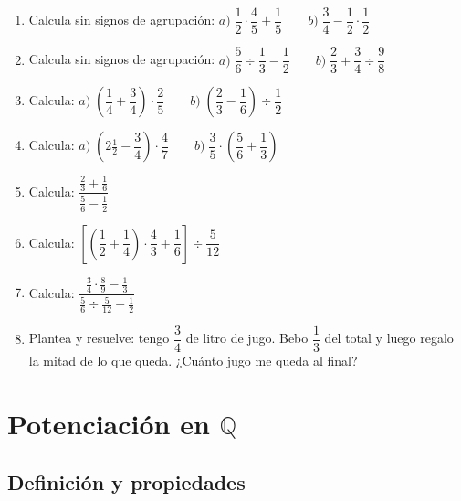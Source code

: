 \documentclass[12pt, letterpaper]{article}
\begin{document}
\begin{enumerate}[leftmargin=*, resume]
  \item \facil{} Calcula sin signos de agrupación: $a) \; \dfrac{1}{2} \cdot \dfrac{4}{5} + \dfrac{1}{5} \qquad b) \; \dfrac{3}{4} - \dfrac{1}{2} \cdot \dfrac{1}{2}$

  \item \facil{} Calcula sin signos de agrupación: $a) \; \dfrac{5}{6} \div \dfrac{1}{3} - \dfrac{1}{2} \qquad b) \; \dfrac{2}{3} + \dfrac{3}{4} \div \dfrac{9}{8}$

  \item \medio{} Calcula: $a) \; \left(\dfrac{1}{4} + \dfrac{3}{4}\right) \cdot \dfrac{2}{5} \qquad b) \; \left(\dfrac{2}{3} - \dfrac{1}{6}\right) \div \dfrac{1}{2}$

  \item \medio{} Calcula: $a) \; \left(2\frac{1}{2} - \dfrac{3}{4}\right) \cdot \dfrac{4}{7} \qquad b) \; \dfrac{3}{5} \cdot \left(\dfrac{5}{6} + \dfrac{1}{3}\right)$

  \item \medio{} Calcula: $\dfrac{\frac{2}{3} + \frac{1}{6}}{\frac{5}{6} - \frac{1}{2}}$

  \item \medio{} Calcula: $\left[\left(\dfrac{1}{2} + \dfrac{1}{4}\right) \cdot \dfrac{4}{3} + \dfrac{1}{6}\right] \div \dfrac{5}{12}$

  \item \dificil{} Calcula: $\dfrac{\frac{3}{4} \cdot \frac{8}{9} - \frac{1}{3}}{\frac{5}{6} \div \frac{5}{12} + \frac{1}{2}}$

  \item \dificil{} Plantea y resuelve: tengo $\dfrac{3}{4}$ de litro de jugo. Bebo $\dfrac{1}{3}$ del total y luego regalo la mitad de lo que queda. ¿Cuánto jugo me queda al final?
\end{enumerate}


\section{Potenciación en $\mathbb{Q}$}

\subsection{Definición y propiedades}
\end{document}
